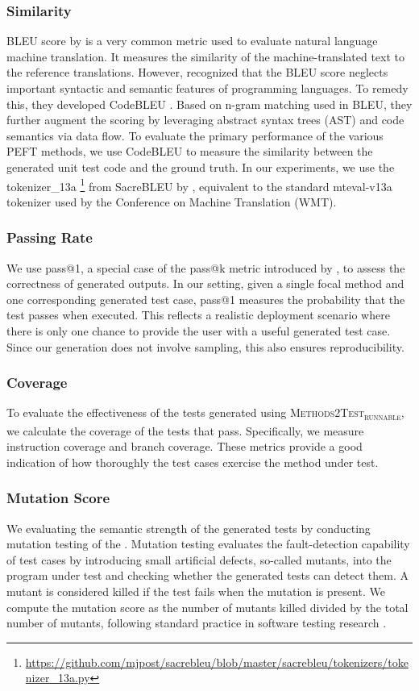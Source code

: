 \documentclass[12pt]{book}
\begin{document}
\subsubsection{Similarity}
BLEU score by \citet{Papineni2002BleuAM} is a very common metric used to evaluate natural language machine translation. It measures the similarity of the machine-translated text to the reference translations. However, \citet{Ren2020CodeBLEUAM} recognized that the BLEU score neglects important syntactic and semantic features of programming languages. To remedy this, they developed CodeBLEU \citep{Ren2020CodeBLEUAM}. Based on n-gram matching used in BLEU, they further augment the scoring by leveraging abstract syntax trees (AST) and code semantics via data flow. To evaluate the primary performance of the various PEFT methods, we use CodeBLEU to measure the similarity between the generated unit test code and the ground truth. In our experiments, we use the tokenizer\_13a \footnote{\url{https://github.com/mjpost/sacrebleu/blob/master/sacrebleu/tokenizers/tokenizer_13a.py}} from SacreBLEU by \citet{bojar2018call}, equivalent to the standard mteval-v13a tokenizer used by the Conference on Machine Translation (WMT).

\subsubsection{Passing Rate} \label{sec:pass-rate}
We use pass@1, a special case of the pass@k metric introduced by \citet{Chen2021EvaluatingLL}, to assess the correctness of generated outputs. In our setting, given a single focal method and one corresponding generated test case, pass@1 measures the probability that the test passes when executed. This reflects a realistic deployment scenario where there is only one chance to provide the user with a useful generated test case. Since our generation does not involve sampling, this also ensures reproducibility. 

\subsubsection{Coverage}
To evaluate the effectiveness of the tests generated using \textsc{Methods2Test\textsubscript{runnable}}, we calculate the coverage of the tests that pass. Specifically, we measure instruction coverage and branch coverage. These metrics provide a good indication of how thoroughly the test cases exercise the method under test.

\subsubsection{Mutation Score}
We evaluating the semantic strength of the generated tests by conducting mutation testing of the . Mutation testing evaluates the fault-detection capability of test cases by introducing small artificial defects, so-called mutants, into the program under test and checking whether the generated tests can detect them. A mutant is considered killed if the test fails when the mutation is present. We compute the mutation score as the number of mutants killed divided by the total number of mutants, following standard practice in software testing research \citep{jia2011an}.
\end{document}
